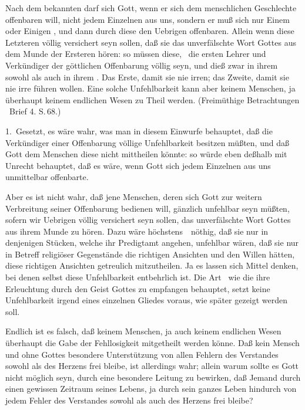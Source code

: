 Nach dem bekannten  darf sich Gott, wenn er sich dem menschlichen Geschlechte offenbaren will, nicht jedem Einzelnen aus uns, sondern er muß sich nur Einem oder Einigen , und dann durch diese den Uebrigen  offenbaren. Allein wenn diese Letzteren völlig versichert seyn sollen, daß sie das unverfälschte Wort Gottes aus dem Munde der Ersteren hören: so müssen diese, \dh\ die ersten Lehrer und Verkündiger der göttlichen Offenbarung völlig  seyn, und dieß zwar in ihrem  sowohl als auch in ihrem . Das Erste, damit sie nie irren; das Zweite, damit sie nie irre führen wollen. Eine solche Unfehlbarkeit kann aber keinem Menschen, ja überhaupt keinem endlichen Wesen zu Theil werden. (Freimüthige Betrachtungen \usw\ Brief 4. S.\,68.)\par
{} 1.~Gesetzt, es wäre wahr, was man in diesem Einwurfe behauptet, daß die Verkündiger einer Offenbarung völlige Unfehlbarkeit besitzen müßten, und daß Gott dem Menschen diese nicht mittheilen könnte: so würde eben deßhalb mit Unrecht behauptet, daß es  wäre, wenn Gott sich jedem Einzelnen aus uns unmittelbar offenbarte.
\begin{aufza}\setcounter{enumi}{1}
\item Aber es ist nicht wahr, daß jene Menschen, deren sich Gott zur weitern Verbreitung seiner Offenbarung bedienen will, gänzlich unfehlbar seyn müßten, sofern wir Uebrigen völlig versichert seyn sollen, das unverfälschte Wort Gottes aus ihrem Munde zu hören. Dazu wäre höchstens~\ nöthig, daß sie nur in denjenigen Stücken, welche ihr Predigtamt angehen, unfehlbar wären, daß sie nur in Betreff religiöser Gegenstände die richtigen Ansichten und den Willen hätten, diese richtigen Ansichten getreulich mitzutheilen. Ja es lassen sich Mittel denken, bei denen selbst diese Unfehlbarkeit entbehrlich ist. Die Art \zB\ wie die  ihre Erleuchtung durch den Geist Gottes zu empfangen behauptet, setzt keine Unfehlbarkeit irgend eines einzelnen Gliedes voraus, wie später gezeigt werden soll.
\item Endlich ist es falsch, daß keinem Menschen, ja auch keinem endlichen Wesen überhaupt die Gabe der Fehllosigkeit mitgetheilt werden könne. Daß kein Mensch  und ohne Gottes besondere Unterstützung von allen Fehlern des Verstandes sowohl als des Herzens frei bleibe, ist allerdings wahr; allein warum sollte es Gott nicht möglich seyn, durch eine besondere Leitung zu bewirken, daß Jemand durch einen gewissen Zeitraum seines Lebens, ja durch sein ganzes Leben hindurch von jedem Fehler des Verstandes sowohl als auch des Herzens frei bleibe?
\end{aufza}

